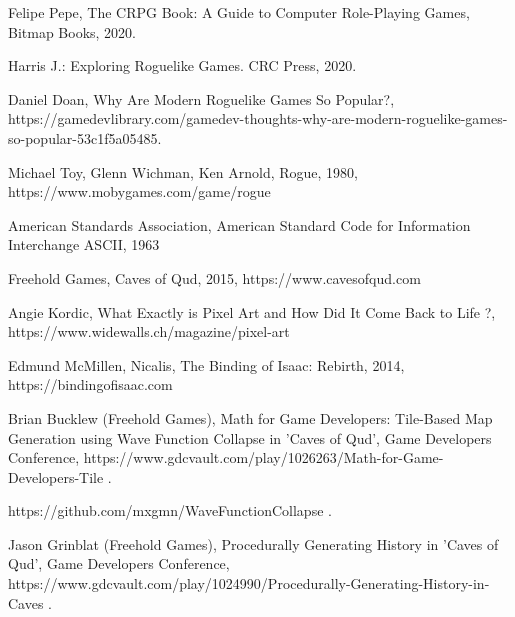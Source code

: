 \documentclass[12pt,twoside]{article}
\begin{document}
\begin{thebibliography}{4}
	

 Felipe Pepe, The CRPG Book: A Guide to Computer Role-Playing Games, Bitmap Books, 2020.

 Harris J.: Exploring Roguelike Games. CRC Press, 2020.

 Daniel Doan, Why Are Modern Roguelike Games So Popular?, https://gamedevlibrary.com/gamedev-thoughts-why-are-modern-roguelike-games-so-popular-53c1f5a05485.

 Michael Toy, Glenn Wichman, Ken Arnold, Rogue, 1980, https://www.mobygames.com/game/rogue

 American Standards Association, American Standard Code for Information Interchange ASCII, 1963

 Freehold Games, Caves of Qud, 2015, https://www.cavesofqud.com

 Angie Kordic, What Exactly is Pixel Art and How Did It Come Back to Life ?, https://www.widewalls.ch/magazine/pixel-art

 Edmund McMillen, Nicalis, The Binding of Isaac: Rebirth, 2014, https://bindingofisaac.com

 Brian Bucklew (Freehold Games), Math for Game Developers: Tile-Based Map Generation using Wave Function Collapse in 'Caves of Qud', Game Developers Conference, https://www.gdcvault.com/play/1026263/Math-for-Game-Developers-Tile .

 https://github.com/mxgmn/WaveFunctionCollapse .

 Jason Grinblat (Freehold Games), Procedurally Generating History in 'Caves of Qud', Game Developers Conference, https://www.gdcvault.com/play/1024990/Procedurally-Generating-History-in-Caves .


\end{thebibliography}
\end{document}
